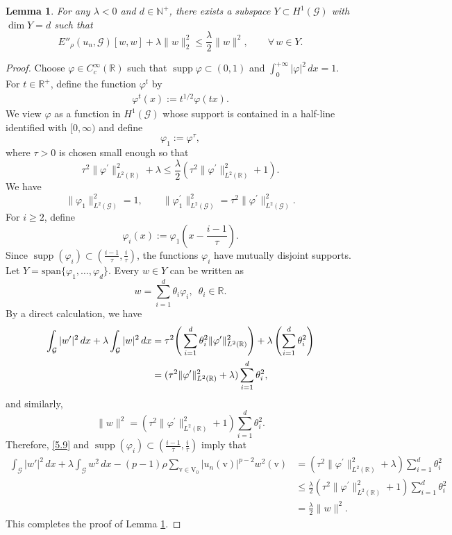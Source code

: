 \documentclass[11pt]{amsart}
\newtheorem{lemma}[theorem]{Lemma}
\newcommand{\G}{\mathcal{G}}
\newcommand{\V}{\mathrm{V}}
\newcommand{\vv}{\mathrm{v}}
\numberwithin{equation}{section}
\begin{document}
\begin{lemma}\label{lem 5.2}
For any \(\lambda<0\) and \(d\in\mathbb{N}^+\), there exists a subspace \(Y\subset H^{1}(\mathcal{G})\) with \(\dim Y =d\) such that
\[
E''_\rho(u_n, \mathcal{G})[w, w] + \lambda \|w\|_2^2 \leq\frac{\lambda}{2}\|w\|^{2}, \qquad\forall\,w\in Y.
\]
\end{lemma}
\begin{proof}
Choose $\varphi\in C_c^\infty(\mathbb{R})$ such that $\operatorname{supp}\varphi\subset(0,1)$ and $\int_0^{+\infty}|\varphi|^2\,dx=1$. For \(t\in\mathbb{R}^{+}\), define the function \(\varphi^{t}\) by
\begin{align}\label{scal}
	\varphi^{t}(x):=t^{1/2}\varphi(tx).
\end{align}
We view $\varphi$ as a function in $H^1(\G)$ whose support is contained in a half-line identified with $[0,\infty)$ and define
\[
\varphi_{1}:=\varphi^{\tau},
\]
where $\tau>0$ is chosen small enough so that
\begin{equation}\label{5.9}
\tau^{2}\|\varphi^{\prime}\|_{L^{2}(\mathbb{R})}^{2}+\lambda\leq\frac{\lambda}{2}(\tau^{2}\|\varphi^{\prime}\|_{L^{2}(\mathbb{R})}^{2}+1).
\end{equation}
We have
\[
\|\varphi_{1}\|_{L^{2}({\G})}^{2}=1,\qquad\|\varphi^{\prime}_{1}\|_{L^{2}({\G})}^{2}=\tau^{2}\|\varphi^{\prime}\|_{L^{2}({\G})}^{2}.
\]
For $i\geq 2$, define
\[
\varphi_{i}(x):=\varphi_{1}\left(x-\frac{i-1}{\tau}\right).
\]
Since $\operatorname{supp}(\varphi_{i})\subset\left(\frac{i-1}{\tau},\frac{i}{\tau}\right)$, the functions $\varphi_{i}$ have mutually disjoint supports. Let $Y=\text{span}\{\varphi_{1},\ldots,\varphi_{d}\}$. Every $w\in Y$ can be written as
\[
w=\sum_{i=1}^{d}\theta_{i}\varphi_{i},\,\,\,\theta_{i}\in \mathbb{R}.
\]
By a direct calculation, we have
\begin{align*}
\int_{\G}|w^{\prime}|^{2}\,dx+\lambda\int_{\G}|w|^{2}\,dx 
&= \tau^{2}\Bigg{(}\sum_{i=1}^{d}\theta_{i}^{2}\|\varphi^{\prime}\|_{L^{2}(\mathbb{R})}^{2}\Bigg{)}+\lambda\left(\sum_{i=1}^{d}\theta_{i}^{2}\right)\\
&=(\tau^{2}\|\varphi^{\prime}\|_{L^{2}(\mathbb{R})}^{2}+\lambda)\sum_{i=1}^{d}\theta_{i}^{2},
\end{align*}
and similarly, 
$$\|w\|^{2}=(\tau^{2}\|\varphi^{\prime}\|_{L^{2}(\mathbb{R})}^{2}+1)\sum_{i=1}^{d}\theta_{i}^{2}.$$
Therefore, \eqref{5.9} and $\operatorname{supp}(\varphi_{i})\subset\left(\frac{i-1}{\tau},\frac{i}{\tau}\right)$ imply that
\begin{align*}
\int_\mathcal{G} |w'|^2 \,dx+ \lambda\int_\mathcal{G} w^2 \,dx-(p-1)\rho\sum _{\vv\in \V_0}|u_n(\vv)|^{p-2}w^{2}(\vv)
&= (\tau^{2}\|\varphi^{\prime}\|_{L^{2}(\mathbb{R})}^{2}+\lambda)\sum_{i=1}^{d}\theta_{i}^{2}\\
&\leq \frac{\lambda}{2}(\tau^{2}\|\varphi^{\prime}\|_{L^{2}(\mathbb{R})}^{2}+1)\sum_{i=1}^{d}\theta_{i}^{2}\\
&= \frac{\lambda}{2}\|w\|^{2}.
\end{align*}
This completes the proof of Lemma \ref{lem 5.2}.
\end{proof}
\end{document}
